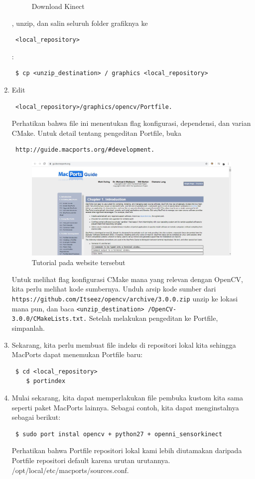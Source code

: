 \begin{enumerate}
\begin{figure}[ht]
		\caption{Download Kinect}
		\label{contoh}
		\end{figure}
	, unzip, dan salin seluruh folder grafiknya ke \begin{verbatim} <local_repository> \end{verbatim}:
	\begin{verbatim} $ cp <unzip_destination> / graphics <local_repository> \end{verbatim}
	\item Edit \begin{verbatim} <local_repository>/graphics/opencv/Portfile. \end{verbatim} Perhatikan bahwa file ini menentukan flag konfigurasi, dependensi, dan varian CMake. Untuk detail tentang pengeditan Portfile, buka \begin{verbatim} http://guide.macports.org/#development. \end{verbatim}
		\begin{figure}[ht]
		\centering
		\includegraphics[scale=0.4]{figures/1,13.jpg}
		\caption{Tutorial pada website tersebut}
		\label{contoh}
		\end{figure}
\newpage
	Untuk melihat flag konfigurasi CMake mana yang relevan dengan OpenCV, kita perlu melihat kode sumbernya. Unduh arsip kode sumber dari
	\verb|https://github.com/Itseez/opencv/archive/3.0.0.zip| unzip ke lokasi mana pun, dan baca \verb|<unzip_destination> /OpenCV-3.0.0/CMakeLists.txt.|
	Setelah melakukan pengeditan ke Portfile, simpanlah.
	\item Sekarang, kita perlu membuat file indeks di repositori lokal kita sehingga MacPorts dapat menemukan Portfile baru:
	\begin{verbatim} $ cd <local_repository>
	$ portindex \end{verbatim}
	\item Mulai sekarang, kita dapat memperlakukan file pembuka kustom kita sama seperti paket MacPorts lainnya. Sebagai contoh, kita dapat menginstalnya sebagai berikut:
	\begin{verbatim} $ sudo port instal opencv + python27 + openni_sensorkinect \end{verbatim}
	Perhatikan bahwa Portfile repositori lokal kami lebih diutamakan daripada Portfile repositori default karena urutan urutannya.
	/opt/local/etc/macports/sources.conf.
\end{enumerate}


